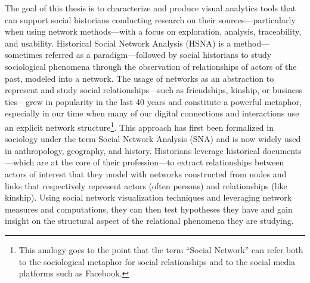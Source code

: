 The goal of this thesis is to characterize and produce visual analytics tools that can support social historians conducting research on their sources---particularly when using network methods---with a focus on exploration, analysis, traceability, and usability.
Historical Social Network Analysis (HSNA) is a method---sometimes referred as a paradigm\cite{whiteNetworkAnalysisEthnographic2005}---followed by social historians to study sociological phenomena through the observation of relationships of actors of the past, modeled into a network.
The usage of networks as an abstraction to represent and study social relationships---such as friendships, kinship, or business ties---grew in popularity in the last 40 years \cite{freemanDevelopmentSocialNetwork2004, tabassumSocialNetworkAnalysis2018} and constitute a powerful metaphor, especially in our time when many of our digital connections and interactions use an explicit network structure\footnote{This analogy goes to the point that the term ``Social Network'' can refer both to the sociological metaphor for social relationships and to the social media platforms such as Facebook.}.
This approach has first been formalized in sociology under the term Social Network Analysis (SNA)\cite{freemanDevelopmentSocialNetwork2004} and is now widely used in anthropology, geography, and history\cite{kerschbaumerPowerNetworksProspects2015}.
Historians leverage historical documents---which are at the core of their profession\cite{langloisIntroductionAuxEtudes2014}---to extract relationships between actors of interest that they model with networks constructed from nodes and links that respectively represent actors (often persons) and relationships (like kinship).
Using social network visualization techniques and leveraging network measures and computations, they can then test hypotheses they have and gain insight on the structural aspect of the relational phenomena they are studying\cite{wetherellHistoricalSocialNetwork1998, kerschbaumerPowerNetworksProspects2015}.
